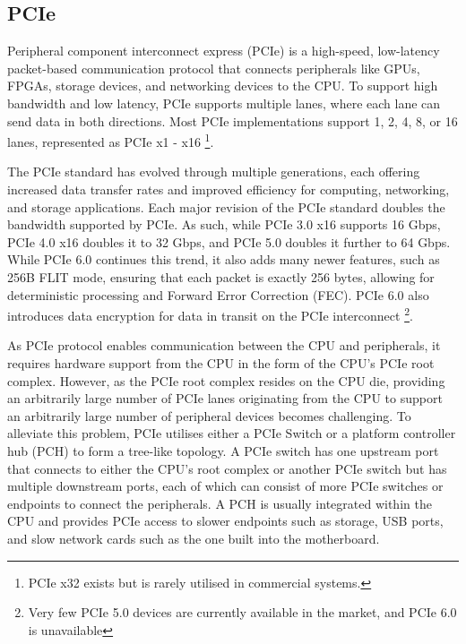\subsection{PCIe}
\label{subsec:interconnect-sc-background-pcie}

Peripheral component interconnect express (PCIe) is a high-speed, low-latency packet-based communication protocol that connects peripherals like GPUs, FPGAs, storage devices, and networking devices to the CPU. 
To support high bandwidth and low latency, PCIe supports multiple lanes, where each lane can send data in both directions.
Most PCIe implementations support 1, 2, 4, 8, or 16 lanes, represented as PCIe x1 - x16
\footnote{PCIe x32 exists but is rarely utilised in commercial systems.}.

The PCIe standard has evolved through multiple generations, each offering increased data transfer rates and improved efficiency for computing, networking, and storage applications.
Each major revision of the PCIe standard doubles the bandwidth supported by PCIe.
As such, while PCIe 3.0 x16 supports 16 Gbps, PCIe 4.0 x16 doubles it to 32 Gbps, and PCIe 5.0 doubles it further to 64 Gbps.
While PCIe 6.0 continues this trend, it also adds many newer features, such as 256B FLIT mode, ensuring that each packet is exactly 256 bytes, allowing for deterministic processing and Forward Error Correction (FEC).
PCIe 6.0 also introduces data encryption for data in transit on the PCIe interconnect
\footnote{Very few PCIe 5.0 devices are currently available in the market, and PCIe 6.0 is unavailable}.

As PCIe protocol enables communication between the CPU and peripherals, it requires hardware support from the CPU in the form of the CPU's PCIe root complex.
However, as the PCIe root complex resides on the CPU die, providing an arbitrarily large number of PCIe lanes originating from the CPU to support an arbitrarily large number of peripheral devices becomes challenging.
To alleviate this problem, PCIe utilises either a PCIe Switch or a platform controller hub (PCH) to form a tree-like topology.
A PCIe switch has one upstream port that connects to either the CPU's root complex or another PCIe switch but has multiple downstream ports, each of which can consist of more PCIe switches or endpoints to connect the peripherals.
A PCH is usually integrated within the CPU and provides PCIe access to slower endpoints such as storage, USB ports, and slow network cards such as the one built into the motherboard.

